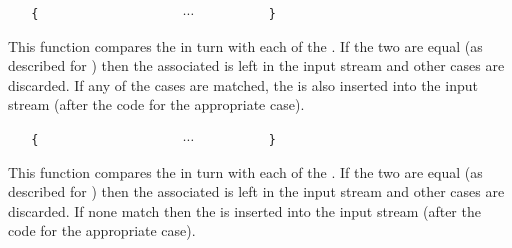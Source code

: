 \documentclass[oneside]{book}
\begin{document}
\begin{function}{\tlVarCaseT}
\begin{syntax}
 
~ ~ \verb"{"
~ ~ ~ ~  
~ ~ ~ ~  
~ ~ ~ ~ $\cdots$
~ ~ ~ ~  
~ ~ \verb"}"
~ ~ 
\end{syntax}
This function compares the  in turn
with each of the . If the two
are equal (as described for )
then the associated  is left in the input
stream and other cases are discarded. If any of the
cases are matched, the  is also inserted into the
input stream (after the code for the appropriate case).
\begin{demohigh}
\IgnoreSpacesOn
\tlSet {}
\tlSet {}
\tlSet {}
\tlSet {}
\tlVarCaseT {}
\IgnoreSpacesOff
\end{demohigh}
\end{function}

\begin{function}{\tlVarCaseF}
\begin{syntax}
 
~ ~ \verb"{"
~ ~ ~ ~  
~ ~ ~ ~  
~ ~ ~ ~ $\cdots$
~ ~ ~ ~  
~ ~ \verb"}"
~ ~ 
\end{syntax}
This function compares the  in turn
with each of the . If the two
are equal (as described for )
then the associated  is left in the input
stream and other cases are discarded. If none match then the 
is inserted into the input stream (after the code for the appropriate case).
\begin{demohigh}
\IgnoreSpacesOn
\tlSet {}
\tlSet {}
\tlSet {}
\tlSet {}
\tlVarCaseF {}
\IgnoreSpacesOff
\end{demohigh}
\end{function}
\end{document}
